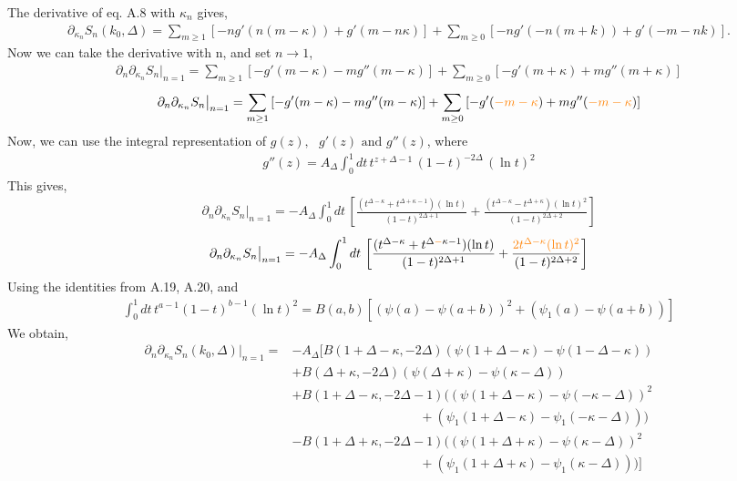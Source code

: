 \documentclass[11pt]{article}
\newcommand{\p}{\partial}
\newcommand{\nn}{\nonumber}
\newcommand{\lb}{\left(}
\newcommand{\rb}{\right)}
\newcommand{\JM}[1]{\textcolor{orange}{#1}}
\begin{document}
  The derivative of eq. A.8 with $\kappa_n$ gives,
  \begin{align}
      \p_{\kappa_n}S_n(k_0,\Delta) = \sum_{m\geq 1} \left[ -n g'(n(m-\kappa)) + g'(m-n\kappa) \right] + \sum_{m\geq 0} \left[ -ng'(-n(m+k))  + g'(-m-nk)\right]. 
  \end{align}
Now we can take the derivative with n, and set $n\to 1$,
\begin{align}
    \p_n\p_{\kappa_n}S_n\big|_{n= 1} = \sum_{m\geq 1}\left[ -g'(m-\kappa) -mg''(m-\kappa) \right] + \sum_{m\geq 0}\left[ -g'(m+\kappa)  + mg''(m+\kappa)\right]
\end{align}
\begin{align*}
    \p_n\p_{\kappa_n}S_n\big|_{n= 1} = \sum_{m\geq 1}\left[ -g'(m-\kappa) -mg''(m-\kappa) \right] + \sum_{m\geq 0}\left[ -g'(\JM{-m-\kappa})  + mg''(\JM{-m-\kappa})\right]
\end{align*}
Now, we can use the integral representation of $g(z),\text{ } g'(z) \text{ and } g''(z)$, where 
\begin{align}
    g''(z) = A_\Delta \int_0^1 dt \, t^{z + \Delta -1} \, (1-t)^{-2\Delta} \, (\ln t)^2
\end{align}
This gives,
\begin{align}
    \p_n\p_{\kappa_n}S_n\big|_{n= 1} = -A_{\Delta} \int_0^1 dt\, \left[\frac{(t^{\Delta - \kappa} + t^{\Delta + \kappa - 1})(\ln t)}{(1-t)^{2\Delta +1}} + \frac{(t^{\Delta - \kappa} - t^{\Delta + \kappa})(\ln t)^2}{(1-t)^{2\Delta +2}}\right] 
\end{align}
\begin{align*}
    \p_n\p_{\kappa_n}S_n\big|_{n= 1} = -A_{\Delta} \int_0^1 dt\, \left[\frac{(t^{\Delta - \kappa} + t^{\Delta \JM{-}\kappa - 1})(\ln t)}{(1-t)^{2\Delta +1}} + \frac{\JM{2t^{\Delta - \kappa} (\ln t)^2}}{(1-t)^{2\Delta +2}}\right] 
\end{align*}
Using the identities from A.19, A.20, and 
\begin{align}
    \int_0^1 dt \, t^{a-1} (1-t)^{b-1}(\ln t)^2 = B(a,b)\left[( \psi (a) - \psi(a+b))^2 + (\psi_1(a) - \psi(a+b))\right]
\end{align}
We obtain,
\begin{align}
    \p_n \p_{\kappa_n}S_n(k_0,\Delta)\big|_{n=1} =& -A_{\Delta}\Big[ B(1+ \Delta - \kappa, -2\Delta)(\psi(1+ \Delta - \kappa) - \psi(1-\Delta - \kappa)) \nn \\
    &+ B(\Delta + \kappa, - 2\Delta)(\psi(\Delta + \kappa) - \psi(\kappa - \Delta))  \nn \\
    &+B(1+ \Delta - \kappa, -2\Delta - 1)\big( \lb \psi(1+\Delta - \kappa) - \psi(-\kappa-\Delta)\rb^2 \nn \\
    & \qquad \qquad \qquad \qquad \qquad +\lb \psi_1(1+\Delta - \kappa) - \psi_1(-\kappa - \Delta)\rb \big)\nn \\
    &- B(1+\Delta + \kappa, -2\Delta - 1) \big( \lb \psi(1+ \Delta + \kappa) - \psi(\kappa - \Delta) \rb^2 \nn \\
    &\qquad \qquad \qquad \qquad \qquad + \lb \psi_1(1+ \Delta + \kappa ) - \psi_1(\kappa - \Delta) \rb 
    \big)
    \Big] 
\end{align}
\end{document}

